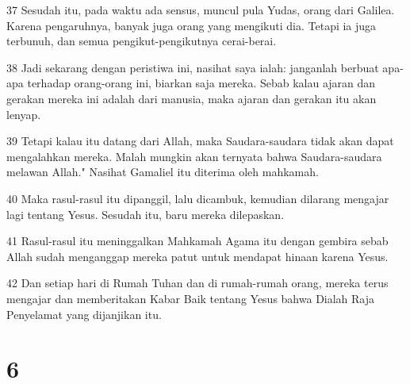 \par 37 Sesudah itu, pada waktu ada sensus, muncul pula Yudas, orang dari Galilea. Karena pengaruhnya, banyak juga orang yang mengikuti dia. Tetapi ia juga terbunuh, dan semua pengikut-pengikutnya cerai-berai.
\par 38 Jadi sekarang dengan peristiwa ini, nasihat saya ialah: janganlah berbuat apa-apa terhadap orang-orang ini, biarkan saja mereka. Sebab kalau ajaran dan gerakan mereka ini adalah dari manusia, maka ajaran dan gerakan itu akan lenyap.
\par 39 Tetapi kalau itu datang dari Allah, maka Saudara-saudara tidak akan dapat mengalahkan mereka. Malah mungkin akan ternyata bahwa Saudara-saudara melawan Allah." Nasihat Gamaliel itu diterima oleh mahkamah.
\par 40 Maka rasul-rasul itu dipanggil, lalu dicambuk, kemudian dilarang mengajar lagi tentang Yesus. Sesudah itu, baru mereka dilepaskan.
\par 41 Rasul-rasul itu meninggalkan Mahkamah Agama itu dengan gembira sebab Allah sudah menganggap mereka patut untuk mendapat hinaan karena Yesus.
\par 42 Dan setiap hari di Rumah Tuhan dan di rumah-rumah orang, mereka terus mengajar dan memberitakan Kabar Baik tentang Yesus bahwa Dialah Raja Penyelamat yang dijanjikan itu.

\chapter{6}

